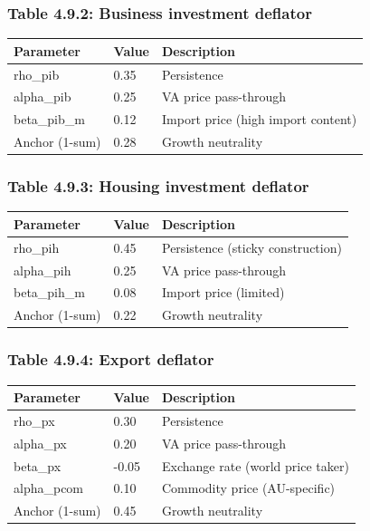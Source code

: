 \documentclass[
]{article}
\newcounter{none} %
\begin{document}
\subsubsection{Table 4.9.2: Business investment
deflator}\label{table-4.9.2-business-investment-deflator}

{\def\LTcaptype{none} %
\begin{longtable}[]{@{}lll@{}}
\toprule\noalign{}
Parameter & Value & Description \\
\midrule\noalign{}
\endhead
\bottomrule\noalign{}
\endlastfoot
rho\_pib & 0.35 & Persistence \\
alpha\_pib & 0.25 & VA price pass-through \\
beta\_pib\_m & 0.12 & Import price (high import content) \\
Anchor (1-sum) & 0.28 & Growth neutrality \\
\end{longtable}
}

\subsubsection{Table 4.9.3: Housing investment
deflator}\label{table-4.9.3-housing-investment-deflator}

{\def\LTcaptype{none} %
\begin{longtable}[]{@{}lll@{}}
\toprule\noalign{}
Parameter & Value & Description \\
\midrule\noalign{}
\endhead
\bottomrule\noalign{}
\endlastfoot
rho\_pih & 0.45 & Persistence (sticky construction) \\
alpha\_pih & 0.25 & VA price pass-through \\
beta\_pih\_m & 0.08 & Import price (limited) \\
Anchor (1-sum) & 0.22 & Growth neutrality \\
\end{longtable}
}

\subsubsection{Table 4.9.4: Export
deflator}\label{table-4.9.4-export-deflator}

{\def\LTcaptype{none} %
\begin{longtable}[]{@{}lll@{}}
\toprule\noalign{}
Parameter & Value & Description \\
\midrule\noalign{}
\endhead
\bottomrule\noalign{}
\endlastfoot
rho\_px & 0.30 & Persistence \\
alpha\_px & 0.20 & VA price pass-through \\
beta\_px & -0.05 & Exchange rate (world price taker) \\
alpha\_pcom & 0.10 & Commodity price (AU-specific) \\
Anchor (1-sum) & 0.45 & Growth neutrality \\
\end{longtable}
}
\end{document}

